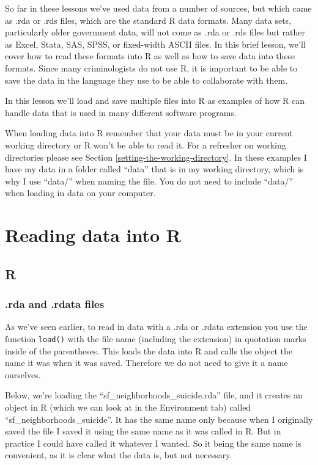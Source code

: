 \documentclass[
]{krantz}
\begin{document}
So far in these lessons we've used data from a number of
sources, but which came as .rda or .rds files, which are the
standard R data formats. Many data sets, particularly older
government data, will not come as .rda or .rds files but
rather as Excel, Stata, SAS, SPSS, or fixed-width ASCII
files. In this brief lesson, we'll cover how to read these
formats into R as well as how to save data into these
formats. Since many criminologists do not use R, it is
important to be able to save the data in the language they
use to be able to collaborate with them.

In this lesson we'll load and save multiple files into R as
examples of how R can handle data that is used in many
different software programs.

When loading data into R remember that your data must be in
your current working directory or R won't be able to read
it. For a refresher on working directories please see
Section \ref{setting-the-working-directory}. In these
examples I have my data in a folder called ``data'' that is
in my working directory, which is why I use ``data/'' when
naming the file. You do not need to include ``data/'' when
loading in data on your computer.

\hypertarget{reading-data-into-r-1}{%
\section{Reading data into R}\label{reading-data-into-r-1}}

\hypertarget{r}{%
\subsection{R}\label{r}}

\hypertarget{rda-and-.rdata-files}{%
\subsubsection{.rda and .rdata
files}\label{rda-and-.rdata-files}}

As we've seen earlier, to read in data with a .rda or .rdata
extension you use the function \texttt{load()} with the file
name (including the extension) in quotation marks inside of
the parentheses. This loads the data into R and calls the
object the name it was when it was saved. Therefore we do
not need to give it a name ourselves.

Below, we're loading the ``sf\_neighborhoods\_suicide.rda''
file, and it creates an object in R (which we can look at in
the Environment tab) called ``sf\_neighborhoods\_suicide''.
It has the same name only because when I originally saved
the file I saved it using the same name as it was called in
R. But in practice I could have called it whatever I wanted.
So it being the same name is convenient, as it is clear what
the data is, but not necessary.
\end{document}
